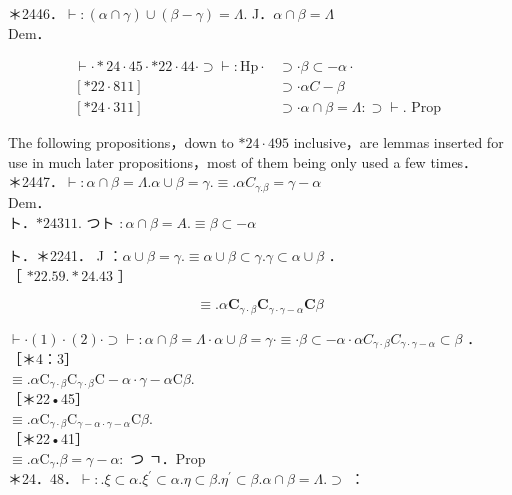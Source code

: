 \documentclass[10pt]{article}
\begin{document}
＊2446．$\vdash:(\alpha \cap \gamma) \cup(\beta-\gamma)=\Lambda$. J．$\alpha \cap \beta=\Lambda$\\
Dem．

$$
\begin{array}{ll}
\vdash \cdot * 24 \cdot 45 \cdot * 22 \cdot 44 \cdot \supset \vdash: \mathrm{Hp} \cdot & \supset \cdot \beta \subset-\alpha \cdot \\
{[* 22 \cdot 811]} & \supset \cdot \alpha C-\beta \\
{[* 24 \cdot 311]} & \supset \cdot \alpha \cap \beta=\Lambda: \supset \vdash . \text { Prop }
\end{array}
$$

The following propositions，down to $* 24 \cdot 495$ inclusive，are lemmas inserted for use in much later propositions，most of them being only used a few times．\\
＊2447．$\vdash: \alpha \cap \beta=\Lambda . \alpha \cup \beta=\gamma . \equiv . \alpha C_{\gamma . \beta}=\gamma-\alpha$\\
Dem．\\
ト．$* 24311$. つト $: \alpha \cap \beta=A . \equiv \beta \subset-\alpha$

ト．＊2241． J ：$\alpha \cup \beta=\gamma . \equiv \alpha \cup \beta \subset \gamma . \gamma \subset \alpha \cup \beta$ ．\\
［ $* 22.59 . * 24.43$ ］

$$
\equiv . \alpha \mathbf{C}_{\gamma \cdot \beta} \mathbf{C}_{\gamma \cdot \gamma-\alpha} \mathbf{C} \beta
$$

$\vdash \cdot(1) \cdot(2) \cdot \supset \vdash: \alpha \cap \beta=\Lambda \cdot \alpha \cup \beta=\gamma \cdot \equiv \cdot \beta \subset-\alpha \cdot \alpha C_{\gamma \cdot \beta} C_{\gamma \cdot \gamma-\alpha} \subset \beta$ ．\\
［＊4：3］\\
$\equiv . \alpha \mathrm{C}_{\gamma \cdot \beta} \mathrm{C}_{\gamma \cdot \beta} \mathrm{C}-\alpha \cdot \gamma-\alpha \mathrm{C} \beta$.\\
［＊22•45］\\
$\equiv . \alpha \mathrm{C}_{\gamma \cdot \beta} \mathrm{C}_{\gamma-\alpha \cdot \gamma-\alpha} \mathrm{C} \beta$.\\
［＊22•41］\\
$\equiv . \alpha \mathrm{C}_{\gamma} . \beta=\gamma-\alpha:$ つ ㄱ．Prop\\
＊24．48．$\vdash: . \xi \subset \alpha . \xi^{\prime} \subset \alpha . \eta \subset \beta . \eta^{\prime} \subset \beta . \alpha \cap \beta=\Lambda . \supset$ ：
\end{document}
